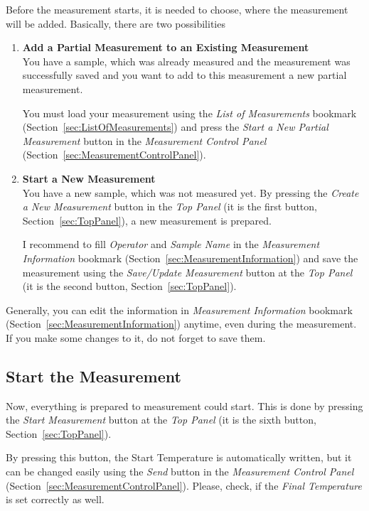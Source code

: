 \documentclass[a4paper,11pt,oneside]{report}
\theoremstyle{named}
\begin{document}
Before the measurement starts, it is needed to choose, where the measurement
will be added. Basically, there are two possibilities

\begin{enumerate}
  \item \textbf{Add a Partial Measurement to an Existing Measurement} \\
    You have a sample, which was already measured and the measurement was
    successfully saved and you want to add to this measurement a new partial
    measurement.

    You must load your measurement using the \textit{List of Measurements} bookmark
    (Section~\ref{sec:ListOfMeasurements}) and press the \textit{Start a New
    Partial Measurement} button in the \textit{Measurement Control Panel}
    (Section~\ref{sec:MeasurementControlPanel}).

  \item \textbf{Start a New Measurement} \\
    You have a new sample, which was not measured yet. By pressing the
    \textit{Create a New Measurement} button in the \textit{Top Panel}
    (it is the first button, Section~\ref{sec:TopPanel}), a new measurement is
    prepared.

    I recommend to fill \textit{Operator} and \textit{Sample Name} in the
    \textit{Measurement Information} bookmark
    (Section~\ref{sec:MeasurementInformation}) and save the measurement using
    the \textit{Save/Update Measurement} button at the \textit{Top Panel}
    (it is the second button, Section~\ref{sec:TopPanel}). 
\end{enumerate}

Generally, you can edit the information in \textit{Measurement Information}
bookmark (Section~\ref{sec:MeasurementInformation}) anytime, even during the
measurement. If you make some changes to it, do not forget to save them.

\subsection{Start the Measurement}

Now, everything is prepared to measurement could start. This is done by pressing
the \textit{Start Measurement} button at the \textit{Top Panel} (it is the
sixth button, Section~\ref{sec:TopPanel}).

By pressing this button, the Start Temperature is automatically written, but
it can be changed easily using the \textit{Send} button in the
\textit{Measurement Control Panel} (Section~\ref{sec:MeasurementControlPanel}).
Please, check, if the \textit{Final Temperature} is set correctly as well.
\end{document}
